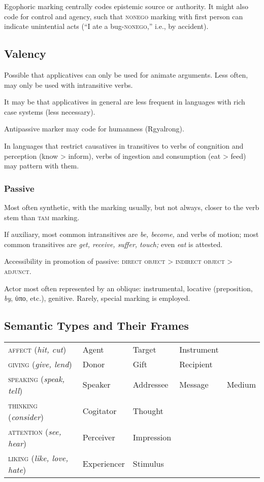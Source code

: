 \documentclass[11pt]{article}
\newcommand{\E}[1]{\textit{#1}}   %
\newcommand{\I}[1]{\textsc{#1}}   %
\begin{document}
Egophoric marking centrally codes epistemic source or authority.  It
might also code for control and agency, such that \I{nonego} marking
with first person can indicate unintential acts (``I ate a
bug-\I{nonego},'' i.e., by accident).


\subsection{Valency}
Possible that applicatives can only be used for animate arguments.
Less often, may only be used with intransitive verbs.

It may be that applicatives in general are less frequent in languages
with rich case systems (less necessary).

Antipassive marker may code for humanness (Rgyalrong).

In languages that restrict causatives in transitives to verbs of
congnition and perception (know > inform), verbs of ingestion and
consumption (eat > feed) may pattern with them.

\subsubsection{Passive} Most often synthetic, with the marking usually,
but not always, closer to the verb stem than \I{tam} marking.

If auxiliary, most common intransitives are \textit{be, become,} and
verbs of motion; most common transitives are \textit{get, receive,
suffer, touch;} even \textit{eat} is attested.

Accessibility in promotion of passive: \I{direct object > indirect
object > adjunct}.

Actor most often represented by an oblique: instrumental, locative
(preposition, \textit{by}, ὑπο, etc.), genitive.  Rarely, special
marking is employed.


\subsection{Semantic Types and Their Frames}

\begin{center}
\begin{tabular}{lllll}
\I{affect} (\E{hit, cut}) & Agent & Target & Instrument \\
\I{giving} (\E{give, lend}) & Donor & Gift & Recipient \\
\I{speaking} (\E{speak, tell}) & Speaker & Addressee & Message & Medium \\
\I{thinking} (\E{consider}) & Cogitator & Thought \\
\I{attention} (\E{see, hear}) & Perceiver & Impression \\
\I{liking} (\E{like, love, hate}) & Experiencer & Stimulus
\end{tabular}
\end{center}
\end{document}

